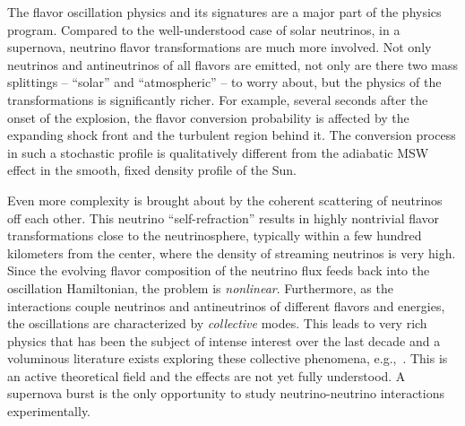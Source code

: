 The flavor oscillation physics and its signatures are a major part of the physics program. Compared to the well-understood case of solar neutrinos, in a supernova, neutrino flavor transformations are much more involved. Not only neutrinos and antineutrinos of all flavors are emitted, not only are there two mass splittings -- ``solar'' and ``atmospheric'' -- to worry about, but the physics of the transformations is significantly richer. For example, several seconds after the onset of the explosion, the flavor conversion probability is affected by the expanding shock front and the turbulent region behind it. The conversion process in such a stochastic profile is qualitatively different from the adiabatic MSW effect in the smooth, fixed density profile of the Sun. 

Even more complexity is brought about by the coherent scattering of neutrinos off each other. This neutrino ``self-refraction'' 
 results in highly nontrivial flavor transformations close to the neutrinosphere, typically within a few hundred kilometers from the center, where the density of streaming neutrinos is very high. Since the evolving flavor composition of the neutrino flux feeds back into the oscillation Hamiltonian, the problem is \emph{nonlinear}. Furthermore, as the interactions couple neutrinos and antineutrinos of different flavors and energies, the oscillations are characterized by \emph{collective} modes.    This leads to very rich physics that has been the subject of intense interest over the last decade and a voluminous literature exists exploring these collective phenomena,
e.g.,~\cite{Duan:2005cp,Fogli:2007bk,Raffelt:2007cb,Raffelt:2007xt,EstebanPretel:2008ni,Duan:2009cd,Dasgupta:2009mg,Duan:2010bg,Duan:2010bf,Wu:2014kaa}.  This is an active theoretical field and the effects are not yet fully understood. A supernova burst is the only opportunity to study neutrino-neutrino interactions experimentally.



